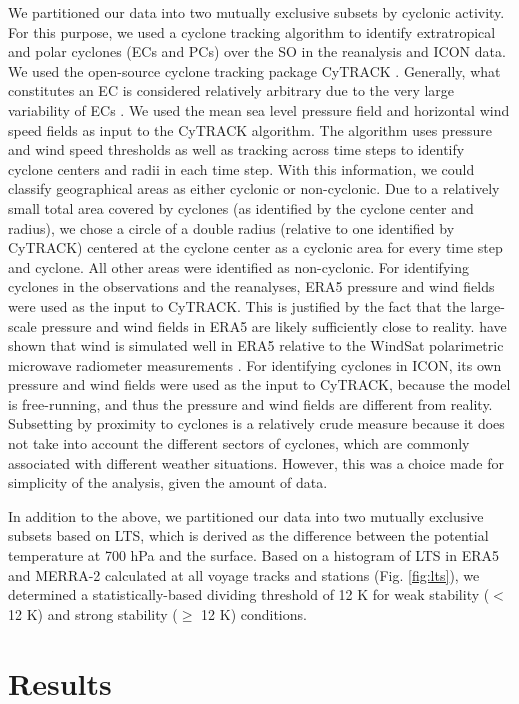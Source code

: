 \documentclass[draft]{agujournal2019}
\begin{document}
We partitioned our data into two mutually exclusive subsets by cyclonic activity. For this purpose, we used a cyclone tracking algorithm to identify extratropical and polar cyclones (ECs and PCs) over the SO in the reanalysis and ICON data. We used the open-source cyclone tracking package CyTRACK \cite{perez-alarcon2024}. Generally, what constitutes an EC is considered relatively arbitrary due to the very large variability of ECs \cite{neu2013}. We used the mean sea level pressure field and horizontal wind speed fields as input to the CyTRACK algorithm. The algorithm uses pressure and wind speed thresholds as well as tracking across time steps to identify cyclone centers and radii in each time step. With this information, we could classify geographical areas as either cyclonic or non-cyclonic. Due to a relatively small total area covered by cyclones (as identified by the cyclone center and radius), we chose a circle of a double radius (relative to one identified by CyTRACK) centered at the cyclone center as a cyclonic area for every time step and cyclone. All other areas were identified as non-cyclonic. For identifying cyclones in the observations and the reanalyses, ERA5 pressure and wind fields were used as the input to CyTRACK. This is justified by the fact that the large-scale pressure and wind fields in ERA5 are likely sufficiently close to reality.  have shown that wind is simulated well in ERA5 relative to the WindSat polarimetric microwave radiometer measurements \cite{meissner2009}. For identifying cyclones in ICON, its own pressure and wind fields were used as the input to CyTRACK, because the model is free-running, and thus the pressure and wind fields are different from reality. Subsetting by proximity to cyclones is a relatively crude measure because it does not take into account the different sectors of cyclones, which are commonly associated with different weather situations. However, this was a choice made for simplicity of the analysis, given the amount of data.

In addition to the above, we partitioned our data into two mutually exclusive subsets based on LTS, which is derived as the difference between the potential temperature at 700 hPa and the surface. Based on a histogram of LTS in ERA5 and MERRA-2 calculated at all voyage tracks and stations (Fig. \ref{fig:lts}), we determined a statistically-based dividing threshold of 12 K for weak stability ($<$ 12 K) and strong stability ($\geq$ 12 K) conditions.

\section{Results}
\label{sec:results}
\end{document}
